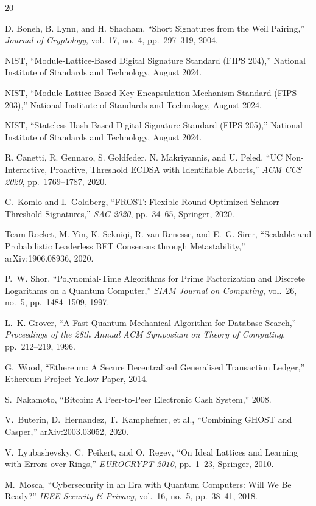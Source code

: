 \documentclass[11pt,a4paper]{article}
\begin{document}
\begin{thebibliography}{20}

D. Boneh, B. Lynn, and H. Shacham, ``Short Signatures from the Weil Pairing,''
\emph{Journal of Cryptology}, vol.~17, no.~4, pp.~297--319, 2004.

NIST, ``Module-Lattice-Based Digital Signature Standard (FIPS 204),''
National Institute of Standards and Technology, August 2024.

NIST, ``Module-Lattice-Based Key-Encapsulation Mechanism Standard (FIPS 203),''
National Institute of Standards and Technology, August 2024.

NIST, ``Stateless Hash-Based Digital Signature Standard (FIPS 205),''
National Institute of Standards and Technology, August 2024.

R. Canetti, R. Gennaro, S. Goldfeder, N. Makriyannis, and U. Peled, ``UC
Non-Interactive, Proactive, Threshold ECDSA with Identifiable Aborts,''
\emph{ACM CCS 2020}, pp.~1769--1787, 2020.

C.~Komlo and I.~Goldberg, ``FROST: Flexible Round-Optimized Schnorr Threshold
Signatures,'' \emph{SAC 2020}, pp.~34--65, Springer, 2020.

Team Rocket, M. Yin, K. Sekniqi, R. van Renesse, and E.~G. Sirer, ``Scalable and
Probabilistic Leaderless BFT Consensus through Metastability,'' arXiv:1906.08936, 2020.

P.~W. Shor, ``Polynomial-Time Algorithms for Prime Factorization and Discrete
Logarithms on a Quantum Computer,'' \emph{SIAM Journal on Computing}, vol.~26,
no.~5, pp.~1484--1509, 1997.

L.~K. Grover, ``A Fast Quantum Mechanical Algorithm for Database Search,''
\emph{Proceedings of the 28th Annual ACM Symposium on Theory of Computing},
pp.~212--219, 1996.

G.~Wood, ``Ethereum: A Secure Decentralised Generalised Transaction Ledger,''
Ethereum Project Yellow Paper, 2014.

S.~Nakamoto, ``Bitcoin: A Peer-to-Peer Electronic Cash System,'' 2008.

V.~Buterin, D.~Hernandez, T.~Kamphefner, et al., ``Combining GHOST and Casper,''
arXiv:2003.03052, 2020.

V.~Lyubashevsky, C.~Peikert, and O.~Regev, ``On Ideal Lattices and Learning with
Errors over Rings,'' \emph{EUROCRYPT 2010}, pp.~1--23, Springer, 2010.

M.~Mosca, ``Cybersecurity in an Era with Quantum Computers: Will We Be Ready?''
\emph{IEEE Security \& Privacy}, vol.~16, no.~5, pp.~38--41, 2018.

\end{thebibliography}
\end{document}
